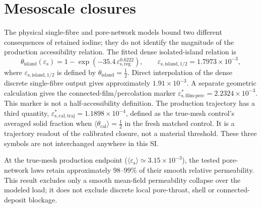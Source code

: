 \documentclass[11pt]{article}
\newcommand{\epss}{\varepsilon_{\mathrm{s}}}
\newcommand{\thetacal}{\theta_{\mathrm{cal}}}
\newcommand{\thetaisland}{\theta_{\mathrm{island}}}
\newcommand{\epscalstar}{\varepsilon_{\mathrm{s,cal,traj}}^{*}}
\newcommand{\epsislandhalf}{\varepsilon_{\mathrm{s,island},1/2}}
\newcommand{\epsfilmperc}{\varepsilon_{\mathrm{s,film\text{-}perc}}^{*}}
\begin{document}
\section{Mesoscale closures}\label{sec:meso}
The physical single-fibre and pore-network models bound two different consequences of retained iodine; they
do not identify the magnitude of the production accessibility relation. The fitted dense isolated-island
relation is
\begin{equation}
\thetaisland(\epss)=1-\exp\!\left(-35.4\,\varepsilon_{\mathrm{s,reg}}^{0.6222}\right),
\qquad
\epsislandhalf=1.7973\times10^{-3},
\label{eq:thetaisland}
\end{equation}
where $\epsislandhalf$ is defined by $\thetaisland=\tfrac12$. Direct interpolation of the dense discrete
single-fibre output gives approximately $1.91\times10^{-3}$. A separate geometric calculation gives the
connected-film/percolation marker $\epsfilmperc=2.2324\times10^{-3}$. This marker is not a
half-accessibility definition. The production trajectory has a third quantity,
$\epscalstar=1.1898\times10^{-4}$, defined as the true-mesh control's averaged solid fraction when
$\langle\thetacal\rangle=\tfrac12$ in the fresh matched control. It is a trajectory readout of the calibrated
closure, not a material threshold. These three symbols are not interchanged anywhere in this SI.

At the true-mesh production endpoint ($\langle\epss\rangle\simeq3.15\times10^{-3}$), the tested pore-network laws
retain approximately $98$--$99\%$ of their smooth relative permeability. This result excludes only a smooth
mean-field permeability collapse over the modeled load; it does not exclude discrete local pore-throat,
shell or connected-deposit blockage.
\end{document}

